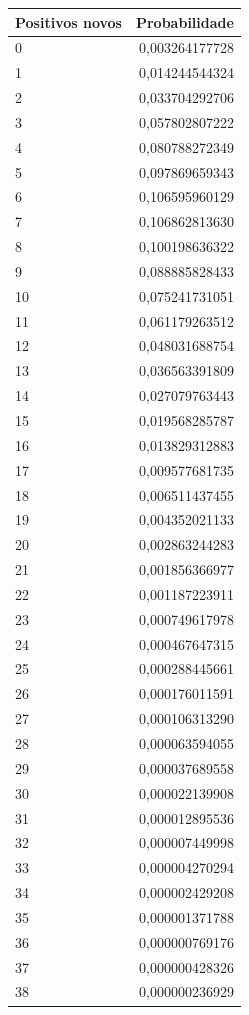 \begin{tabular}{lr}
\toprule
Positivos novos & Probabilidade \\
\midrule
0 & 0,003264177728 \\
1 & 0,014244544324 \\
2 & 0,033704292706 \\
3 & 0,057802807222 \\
4 & 0,080788272349 \\
5 & 0,097869659343 \\
6 & 0,106595960129 \\
7 & 0,106862813630 \\
8 & 0,100198636322 \\
9 & 0,088885828433 \\
10 & 0,075241731051 \\
11 & 0,061179263512 \\
12 & 0,048031688754 \\
13 & 0,036563391809 \\
14 & 0,027079763443 \\
15 & 0,019568285787 \\
16 & 0,013829312883 \\
17 & 0,009577681735 \\
18 & 0,006511437455 \\
19 & 0,004352021133 \\
20 & 0,002863244283 \\
21 & 0,001856366977 \\
22 & 0,001187223911 \\
23 & 0,000749617978 \\
24 & 0,000467647315 \\
25 & 0,000288445661 \\
26 & 0,000176011591 \\
27 & 0,000106313290 \\
28 & 0,000063594055 \\
29 & 0,000037689558 \\
30 & 0,000022139908 \\
31 & 0,000012895536 \\
32 & 0,000007449998 \\
33 & 0,000004270294 \\
34 & 0,000002429208 \\
35 & 0,000001371788 \\
36 & 0,000000769176 \\
37 & 0,000000428326 \\
38 & 0,000000236929 \\

\end{tabular}
